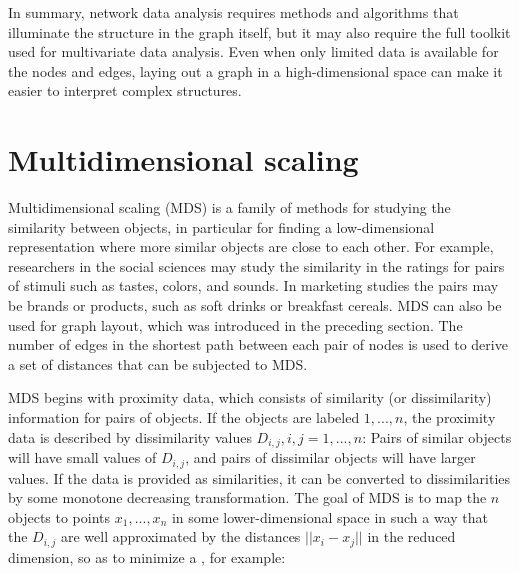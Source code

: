 
In summary, network data analysis requires methods and algorithms that
illuminate the structure in the graph itself, but it may also require
the full toolkit used for multivariate data analysis.  Even when only
limited data is available for the nodes and edges, laying out a graph
in a high-dimensional space can make it easier to interpret complex
structures.


\section{Multidimensional scaling}


Multidimensional scaling (MDS) is a family of methods for studying the
similarity between objects, in particular for finding a low-dimensional
representation where more similar objects are close to each other. For
example, researchers in the social sciences may study the similarity
in the ratings for pairs of stimuli such as tastes, colors, and
sounds. In marketing studies the pairs may be brands or products, such
as soft drinks or breakfast cereals.  MDS can also be used for graph
layout, which was introduced in the preceding section.  The number of
edges in the shortest path between each pair of nodes is used to
derive a set of distances that can be subjected to MDS.

MDS begins with proximity data, which consists of similarity (or
dissimilarity) information for pairs of objects.  If the objects are
labeled $1, ..., n$, the proximity data is described by dissimilarity
values $D_{i,j}, i,j=1, ..., n$: Pairs of similar objects will have
small values of $D_{i,j}$, and pairs of dissimilar objects will have
larger values. If the data is provided as similarities, it can be
converted to dissimilarities by some monotone decreasing
transformation. The goal of MDS is to map the $n$ objects to points
$x_1, ..., x_n$ in some lower-dimensional space in such a way that the
$D_{i,j}$ are well approximated by the distances $||x_i - x_j||$ in
the reduced dimension, so as to minimize a , for
example:

